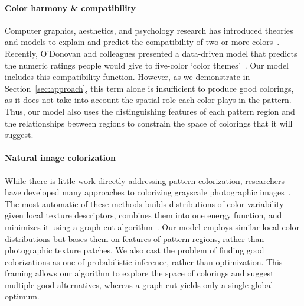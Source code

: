 \paragraph{Color harmony \& compatibility}
Computer graphics, aesthetics, and psychology research has introduced theories and models to explain and predict the compatibility of two or more colors~\cite{CohenOrHarmonization,Munsell,PalmerColorPreference,Itten}. Recently, O'Donovan and colleagues presented a data-driven model that predicts the numeric ratings people would give to five-color `color themes'~.
Our model includes this compatibility function. However, as we demonstrate in Section~\ref{sec:approach}, this term alone is insufficient to produce good colorings, as it does not take into account the spatial role each color plays in the pattern. Thus, our model also uses the distinguishing features of each pattern region and the relationships between regions to constrain the space of colorings that it will suggest.

\paragraph{Natural image colorization}
While there is little work directly addressing pattern colorization, researchers have developed many approaches to colorizing grayscale photographic images~\cite{ScribbleColorization,TransferColorization}. The most automatic of these methods builds distributions of color variability given local texture descriptors, combines them into one energy function, and minimizes it using a graph cut algorithm~\cite{MultimodalColorization}. Our model employs similar local color distributions but bases them on features of pattern regions, rather than photographic texture patches. We also cast the problem of finding good colorizations as one of probabilistic inference, rather than optimization. This framing allows our algorithm to explore the space of colorings and suggest multiple good alternatives, whereas a graph cut yields only a single global optimum.

